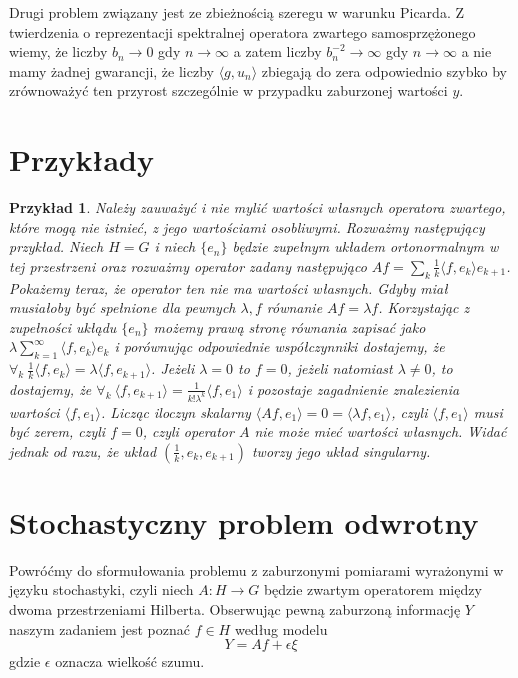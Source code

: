 \documentclass[12pt]{article}
\newtheorem{prz}{Przykład}
\begin{document}
Drugi problem związany jest ze zbieżnością szeregu w warunku Picarda. Z twierdzenia o reprezentacji spektralnej operatora zwartego samosprzężonego wiemy, że liczby $b_n\to 0$ gdy $n\to \infty$ a zatem liczby $b_n^{-2}\to \infty$ gdy $n \to \infty$ a nie mamy żadnej gwarancji, że liczby $\langle g,u_n\rangle$ zbiegają do zera odpowiednio szybko by zrównoważyć ten przyrost szczególnie w przypadku zaburzonej wartości $y$.

\section{Przykłady}

\begin{prz}
Należy zauważyć i nie mylić wartości własnych operatora zwartego, które mogą nie istnieć, z jego wartościami osobliwymi. Rozważmy następujący przykład. Niech $H=G$ i niech $\{e_n\}$ będzie zupełnym układem ortonormalnym w tej przestrzeni oraz rozważmy operator zadany następująco $Af=\sum_k\frac{1}{k}\langle f, e_k\rangle e_{k+1}$. Pokażemy teraz, że operator ten nie ma wartości własnych. Gdyby miał musiałoby być spełnione dla pewnych $\lambda,f$ równanie $Af=\lambda f$. Korzystając z zupełności ukłądu $\{e_n\}$ możemy prawą stronę równania zapisać jako $\lambda\sum_{k=1}^{\infty}\langle f,e_k\rangle e_k$ i porównując odpowiednie współczynniki dostajemy, że $\forall_k\ \frac{1}{k}\langle f,e_k\rangle =\lambda \langle f,e_{k+1}\rangle$. Jeżeli $\lambda=0$ to $f=0$, jeżeli natomiast $\lambda\neq 0$, to dostajemy, że $\forall_k\ \langle f, e_{k+1}\rangle = \frac{1}{k!\lambda^k}\langle f,e_1\rangle$ i pozostaje zagadnienie znalezienia wartości $\langle f, e_1\rangle$. Licząc iloczyn skalarny $\langle Af,e_1\rangle =0 =\langle \lambda f, e_1\rangle$, czyli $\langle f,e_1\rangle$ musi być zerem, czyli $f=0$, czyli operator $A$ nie może mieć wartości własnych. Widać jednak od razu, że układ $(\frac{1}{k},e_k,e_{k+1})$ tworzy jego układ singularny.
\end{prz}


\section{Stochastyczny problem odwrotny}
Powróćmy do sformułowania problemu z zaburzonymi pomiarami wyrażonymi w języku stochastyki, czyli niech $A\colon H\to G$ będzie zwartym operatorem między dwoma przestrzeniami Hilberta. Obserwując pewną zaburzoną informację $Y$ naszym zadaniem jest poznać $f\in H$ według modelu
\begin{displaymath}
Y=Af+\epsilon\xi
\end{displaymath}
gdzie $\epsilon$ oznacza wielkość szumu.
\end{document}
